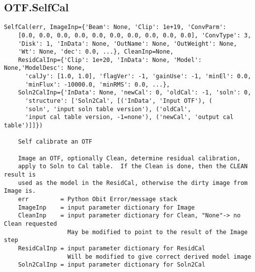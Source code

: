 \documentclass[11pt]{report}
\begin{document}
\subsection{OTF.SelfCal}
\begin{verbatim}
SelfCal(err, ImageInp={'Beam': None, 'Clip': 1e+19, 'ConvParm': 
    [0.0, 0.0, 0.0, 0.0, 0.0, 0.0, 0.0, 0.0, 0.0, 0.0], 'ConvType': 3,
    'Disk': 1, 'InData': None, 'OutName': None, 'OutWeight': None, 
    'Wt': None, 'dec': 0.0, ...}, CleanInp=None, 
    ResidCalInp={'Clip': 1e+20, 'InData': None, 'Model': None,'ModelDesc': None, 
      'calJy': [1.0, 1.0], 'flagVer': -1, 'gainUse': -1, 'minEl': 0.0, 
      'minFlux': -10000.0, 'minRMS': 0.0, ...}, 
    Soln2CalInp={'InData': None, 'newCal': 0, 'oldCal': -1, 'soln': 0,
      'structure': ['Soln2Cal', [('InData', 'Input OTF'), (
      'soln', 'input soln table version'), ('oldCal', 
      'input cal table version, -1=none'), ('newCal', 'output cal table')]]})

    Self calibrate an OTF
    
    Image an OTF, optionally Clean, determine residual calibration,
    apply to Soln to Cal table.  If the Clean is done, then the CLEAN result is
    used as the model in the ResidCal, otherwise the dirty image from Image is.
    err         = Python Obit Error/message stack
    ImageInp    = input parameter dictionary for Image
    CleanInp    = input parameter dictionary for Clean, "None"-> no Clean requested
                  May be modified to point to the result of the Image step
    ResidCalInp = input parameter dictionary for ResidCal
                  Will be modified to give correct derived model image
    Soln2CalInp = input parameter dictionary for Soln2Cal
\end{verbatim}
\end{document}
